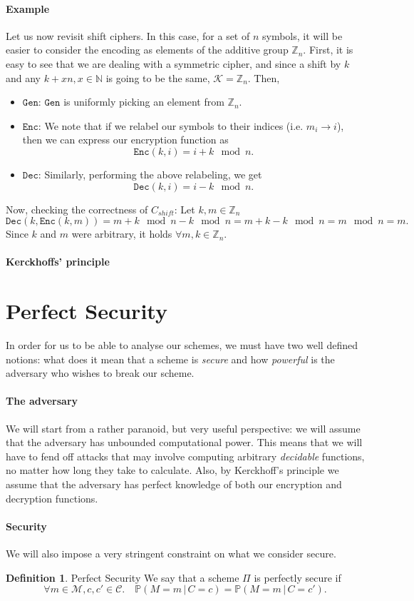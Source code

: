 \documentclass{article}
\theoremstyle{definition}
\newtheorem{definition}{Definition}[section]
\newcommand{\Enc}{\texttt{Enc}}
\newcommand{\Dec}{\texttt{Dec}}
\newcommand{\Gen}{\texttt{Gen}}
\newcommand{\M}{\mathcal{M}}
\newcommand{\C}{\mathcal{C}}
\newcommand{\K}{\mathcal{K}}
\newcommand{\Prob}{\mathbb{P}}
\newcommand{\Int}{\mathbb{Z}}
\begin{document}
\paragraph{Example}
Let us now revisit shift ciphers. In this case, for a set of $n$ symbols, it
will be easier to consider the encoding as elements of the additive group
$\Int_n$. First, it is easy to see that we are dealing with a
symmetric cipher, and since a shift by $k$ and any $k + xn, x \in \mathbb{N}$ is
going to be the same, $\K = \Int_n$. Then,
\begin{itemize}
\item $\Gen$: $\Gen$ is uniformly picking an element from $\Int_n$.
\item $\Enc$: We note that if we relabel our symbols to their
  indices (i.e. $m_i \to i$), then we can express our encryption function as
  \[
    \Enc(k, i) = i + k \mod n.
  \]
\item $\Dec$: Similarly, performing the above relabeling, we get
  \[
    \Dec(k, i) = i - k \mod n.
  \]
\end{itemize}
Now, checking the correctness of $C_{shift}$: Let $k, m \in \Int_n$
\[
  \Dec(k, \Enc(k, m)) = m + k \mod n - k \mod n = m + k - k \mod n = m \mod n = m.
\]
Since $k$ and $m$ were arbitrary, it holds $\forall m, k \in \Int_n$.
\paragraph{Kerckhoffs' principle}

\section{Perfect Security}
In order for us to be able to analyse our schemes, we must have two well defined
notions: what does it mean that a scheme is \textit{secure} and how \textit{powerful} is
the adversary who wishes to break our scheme.
\paragraph{The adversary} We will start from a rather
paranoid, but very useful perspective: we will assume that the adversary has
unbounded computational power. This means that we will have to fend off attacks
that may involve computing arbitrary \textit{decidable} functions, no matter how
long they take to calculate. Also, by Kerckhoff's principle we assume that the
adversary has perfect knowledge of both our encryption and decryption functions.
\paragraph{Security} We will also impose a very stringent constraint on what we
consider secure.
\begin{definition}{Perfect Security}
  \label{def:perfect_security}
We say that a scheme $\Pi$ is perfectly secure if
\[
  \forall m \in \M, c, c' \in \C.\quad \Prob(M=m \,|\, C=c) = \Prob(M=m \,|\, C=c').
\]
\end{definition}
\end{document}

